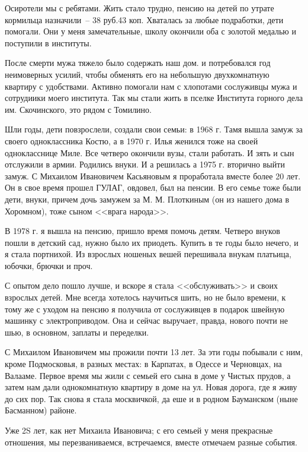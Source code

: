 Осиротели  мы  с ребятами. Жить  стало трудно, пенсию  на  детей  по  утрате 
кормильца назначили~-- 38 руб.43 коп.  Хваталась  за  любые  подработки,  дети 
помогали. Они у меня замечательные,  школу окончили  оба  с  золотой  медалью  и 
поступили в институты.

После  смерти  мужа  тяжело  было  содержать  наш  дом. и потребовался год 
неимоверных усилий, чтобы обменять его на небольшую  двухкомнатную квартиру 
с удобствами. Активно помогали нам с хлопотами сослуживцы мужа и  сотрудиики 
моего  института.  Так  мы  стали  жить  в  пселке  Института  горного дела  им. 
Скочинского, это рядом с Томилино.

Шли годы, дети повзрослели, создали свои семьи:  в 1968 г. Тамя  вышла замуж 
за  своего  одноклассника  Костю,  а  в  1970 г.  Илья  женился  тоже  на  своей 
однокласснице Миле. Все  четверо окончили  вузы, стали  работать. И зять и  сын 
отслужили  в  армии. Родились внуки.  И  а решилась  а 1975 г.  вторично  выйти 
замуж.  С  Михаилом  Ивановичем  Касьяновым  я  проработала  вместе  более  20 
лет. Он в свое время прошел ГУЛАГ, овдовел,  был  на  пенсии.  В его семье  тоже 
были дети, внуки, причем дочь замужем за М. М. Плоткиным  (он из нашего  дома  в 
Хоромном), тоже сыном <<врага народа>>.

В 1978 г. я вышла на пенсию,  пришло время  помочь  детям.  Четверо  внуков 
пошли в детский сад, нужно было их приодеть. Купить в те годы было нечего,  и  я 
стала  портнихой.  Из  взрослых  ношеных  вешей  перешивала  внукам  платьица, 
юбочки, брючки и проч.

С опытом  дело  пошло  лучше,  и  вскоре  я  стала  <<обслуживать>>  и  своих 
взрослых детей. Мне всегда хотелось научиться шить, но не было времени,  к тому 
же  с  уходом  на  пенсию я получила от сослуживцев в подарок швейную  машинку 
с  электроприводом.  Она  и  сейчас  выручает, правда,  нового  почти  не  шью, в 
основном, заплаты и переделки.

С  Михаилом Ивановичем мы прожили  почти  13 лет. За  эти  годы побывали с 
ним, кроме  Подмосковья,  в разных местах: в Карпатах, в Одессе и Черновцах,  на 
Валааме. Первое  время  мы  жили  с семьей  его сына  в доме  у Чистых  прудов, а 
затем  нам  дали  однокомнатную квартиру в доме на ул. Новая дорога, где  я живу 
до сих пор. Так снова я стала  москвичкой,  да еше  и  в родном  Бауманском (ныне 
Басманном) районе.

Уже 2S лет, как  нет  Михаила  Ивановича;  с  его  семьей  у  меня  прекрасные 
отношения,  мы  перезваниваемся,  встречаемся,  вместе отмечаем разные  события.

